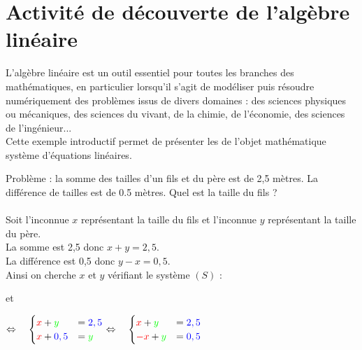 \documentclass{book}
\begin{document}
\chapter*{Activité de découverte de l'algèbre linéaire}
L'algèbre linéaire est un outil essentiel pour toutes les branches des mathématiques, en particulier lorsqu'il s'agit
de modéliser puis résoudre numériquement des problèmes issus de divers domaines : des sciences physiques ou
mécaniques, des sciences du vivant, de la chimie, de l'économie, des sciences de l'ingénieur...\\
Cette exemple introductif permet de présenter les  de l'objet mathématique système d'équations linéaires.

\begin{Exemple}
Problème : la somme des tailles d'un fils et du père est de 2,5 mètres. La différence de tailles  est de 0.5 mètres.
Quel est la taille du fils ? \\
\\  
Soit l'inconnue $x$ représentant la taille du fils et l'inconnue $y$ représentant la taille du père.\\
La somme est 2,5 donc $x+y=2,5$.\\
La différence est 0,5 donc $y-x=0,5$.\\
Ainsi on cherche $x$ et $y$ vérifiant le système $(S)$  :
\begin{center}
et
$\Leftrightarrow\quad \begin{cases}
{\color{red}x}+{\color{green}y}&={\color{blue}2,5}\\
{\color{red}x}+{\color{blue}0,5}&={\color{green}y}
\end{cases}\Leftrightarrow\quad \begin{cases}
{\color{red}x}+{\color{green}y}&={\color{blue}2,5}\\
{\color{red}-x}+{\color{green}y}&={\color{blue}0,5}
\end{cases}
$		
\end{center}
\end{Exemple}
\end{document}
